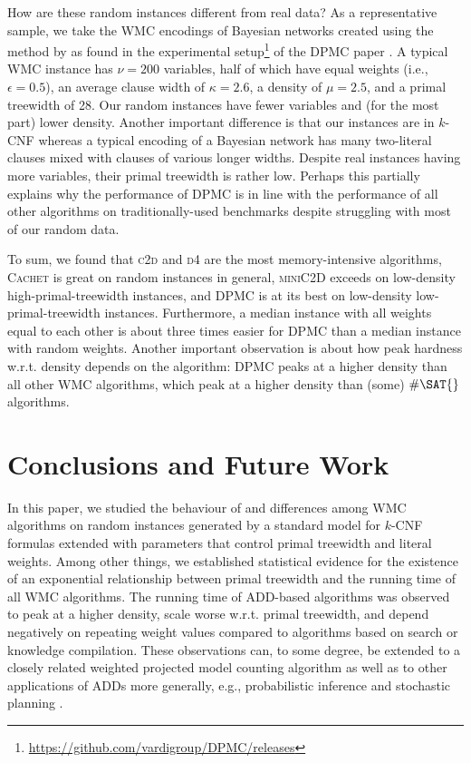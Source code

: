 How are these random instances different from real data? As a representative sample, we take the \textsf{WMC} encodings of Bayesian networks created using the method by \citet{DBLP:conf/aaai/SangBK05} as found in the experimental setup\footnote{\url{https://github.com/vardigroup/DPMC/releases}} of the \textsc{DPMC} paper \citep{DBLP:conf/cp/DudekPV20}. A typical \textsf{WMC} instance has $\nu = 200$ variables, half of which have equal weights (i.e., $\epsilon = 0.5$), an average clause width of $\kappa = 2.6$, a density of $\mu = 2.5$, and a primal treewidth of 28. Our random instances have fewer variables and (for the most part) lower density. Another important difference is that our instances are in $k$-CNF whereas a typical encoding of a Bayesian network has many two-literal clauses mixed with clauses of various longer widths. Despite real instances having more variables, their primal treewidth is rather low. Perhaps this partially explains why the performance of \textsc{DPMC} is in line with the performance of all other algorithms on traditionally-used benchmarks \citep{DBLP:conf/cp/DudekPV20} despite struggling with most of our random data.

To sum, we found that \textsc{c2d} and
\textsc{d4} are the most memory-intensive
algorithms, \textsc{Cachet} is great on random
instances in general, \textsc{miniC2D} exceeds
on low-density high-primal-treewidth instances, and
\textsc{DPMC} is at its best on low-density
low-primal-treewidth instances. Furthermore, a median instance with all weights
equal to each other is about three times easier for \textsc{DPMC} than a median
instance with random weights. Another important observation is about how peak
hardness w.r.t. density depends on the algorithm: \textsc{DPMC} peaks at a
higher density than all other \textsc{WMC} algorithms, which peak at a higher
density than (some) $\#\SAT{}$ algorithms.

\section{Conclusions and Future Work}

In this paper, we studied the behaviour of and differences among \textsf{WMC}
algorithms on random instances generated by a standard model for $k$-CNF
formulas extended with parameters that control primal treewidth and literal
weights. Among other things, we established statistical evidence for the
existence of an exponential relationship between primal treewidth and the
running time of all \textsf{WMC} algorithms. The running time of ADD-based
algorithms was observed to peak at a higher density, scale worse w.r.t. primal
treewidth, and depend negatively on repeating weight values compared to
algorithms based on search or knowledge compilation. These observations can, to
some degree, be extended to a closely related weighted projected model counting
algorithm \citep{DBLP:conf/sat/DudekPV21} as well as to other applications of
ADDs more generally, e.g., probabilistic
inference \citep{DBLP:conf/ijcai/ChaviraD07,DBLP:conf/uai/GogateD11} and
stochastic planning \citep{DBLP:conf/uai/HoeySHB99}.

